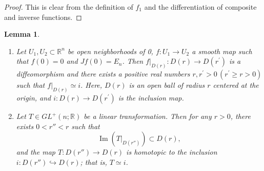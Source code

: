 \documentclass{amsart}
\newtheorem{lem}[thm]{Lemma}
\theoremstyle{definition}
\theoremstyle{remark}
\begin{document}
\begin{proof}
This is clear from the definition of $f_1$ and the differentiation of composite and inverse functions.
\end{proof}

\begin{lem}\label{lem:4.9}
\begin{enumerate}
\item Let $U_1,U_2\subset \mathbb{R}^n$ be open neighborhoods of 0, $f:U_1 \to U_2$ a smooth map such that $f(0)=0$ and $Jf(0)=E_n$.
Then $f|_{D(r)}:D(r)\to D(r^{\prime})$ is a diffeomorphism and there exists a positive real numbers $r, r^{\prime}>0\,(r^{\prime}\ge r>0) $ such that $f|_{D(r)}\simeq i$.
Here, $D(r)$ is an open ball of radius $r$ centered at the origin, and $i:D(r)\to D(r^{\prime})$
is the inclusion map.
\item Let \( T \in GL^{+}(n;\mathbb{R}) \) be a linear transformation. 
Then for any \( r > 0 \), there exists \(0< r'' < r \) such that 
\[
\operatorname{Im}(T|_{D(r'')}) \subset D(r),
\]
and the map \( T \colon D(r'') \to D(r) \) is homotopic to the inclusion \( i \colon D(r'') \hookrightarrow D(r) \); that is, \( T \simeq i \).
\end{enumerate}
\end{lem}
\end{document}
